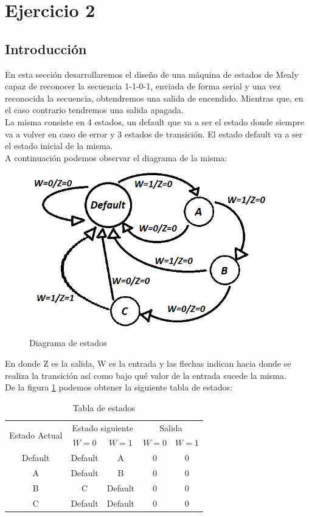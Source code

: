 \section{Ejercicio 2}
\subsection{Introducción}
En esta sección desarrollaremos el diseño de una máquina de estados de Mealy capaz de reconocer la secuencia 1-1-0-1, enviada de forma serial y una vez reconocida la secuencia, obtendremos una salida de encendido. Mientras que, en el caso contrario tendremos una salida apagada.\\
La misma consiste en 4 estados, un default que va a ser el estado donde siempre va a volver en caso de error y 3 estados de transición. El estado default va a ser el estado inicial de la misma.\\
A continuación podemos observar el diagrama de la misma:\\
\begin{figure}[H]
	\centering
	\includegraphics[scale=0.35]{Ejercicio2/Diagrama_de_estados.png}
	\caption{Diagrama de estados}
	\label{f:Mealy}
\end{figure}
En donde Z es la salida, W es la entrada y las flechas indican hacia donde se realiza la transición así como bajo qué valor de la entrada sucede la misma.\\
De la figura \ref{f:Mealy} podemos obtener la siguiente tabla de estados:\\
\begin{table}[H]
	\begin{center}
		\caption{Tabla de estados}
		\begin{tabular}{|c|c c|c c|}
		\hline
		\multirow{2}{*}{Estado Actual} & \multicolumn{2}{|c|}{Estado siguiente} & \multicolumn{2}{|c|}{Salida}\\
		& $W=0$ & $W=1$ & $W=0$ & $W=1$\\
		\hline
		Default & Default & A & 0 & 0\\
		\hline
		A & Default & B & 0 & 0\\
		\hline
		B & C & Default & 0 & 0\\
		\hline
		C & Default & Default & 0 & 0\\
		\hline
		\end{tabular}
	\end{center}
\end{table}
